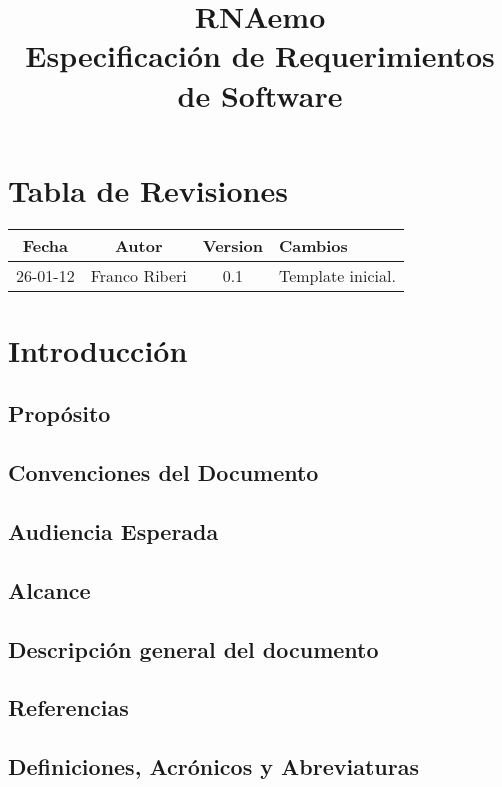 \documentclass[10pt,a4paper,english,spanish]{article}
\title{\textbf{RNAemo}\\ \vspace{0.35cm} Especificación de Requerimientos de Software}
\begin{document}
\maketitle\pagebreak{}\tableofcontents{}\pagebreak{}

\section*{Tabla de Revisiones}
	
\begin{center}
\begin{tabular}{| c | c | c | l |}
	\hline
	{\bf Fecha} & {\bf Autor} & {\bf Version} & {\bf Cambios}\\
	\hline
	\hline		
	26-01-12 & Franco Riberi & 0.1 & Template inicial.\\\hline
\end{tabular}
\end{center}
\newpage

\section{Introducción}

\subsection{Propósito}
\subsection{Convenciones del Documento}
\subsection{Audiencia Esperada}
\subsection{Alcance}
\subsection{Descripción general del documento}
\subsection{Referencias}
\subsection{Definiciones, Acrónicos y Abreviaturas}
\end{document}
